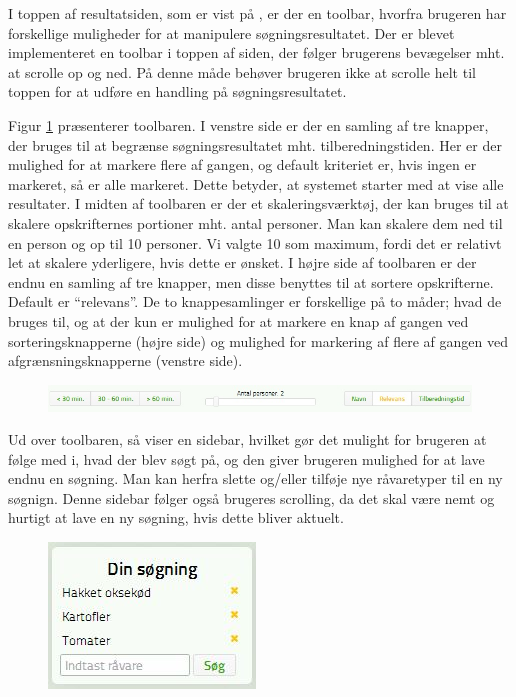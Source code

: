 I toppen af resultatsiden, som er vist på , er der en toolbar, hvorfra brugeren har forskellige muligheder for at manipulere søgningsresultatet. Der er blevet implementeret en toolbar i toppen af siden, der følger brugerens bevægelser mht. at scrolle op og ned. På denne måde behøver brugeren ikke at scrolle helt til toppen for at udføre en handling på søgningsresultatet. 

Figur \ref{fig:foodl-toolbar} præsenterer toolbaren. I venstre side er der en samling af tre knapper, der bruges til at begrænse søgningsresultatet mht. tilberedningstiden. Her er der mulighed for at markere flere af gangen, og default kriteriet er, hvis ingen er markeret, så er alle markeret. Dette betyder, at systemet starter med at vise alle resultater. 
I midten af toolbaren er der et skaleringsværktøj, der kan bruges til at skalere opskrifternes portioner mht. antal personer. Man kan skalere dem ned til en person og op til 10 personer. Vi valgte 10 som maximum, fordi det er relativt let at skalere yderligere, hvis dette er ønsket. 
I højre side af toolbaren er der endnu en samling af tre knapper, men disse benyttes til at sortere opskrifterne. Default er ``relevans''. De to knappesamlinger er forskellige på to måder; hvad de bruges til, og at der kun er mulighed for at markere en knap af gangen ved sorteringsknapperne (højre side) og mulighed for markering af flere af gangen ved afgrænsningsknapperne (venstre side).

\begin{figure}[H]
	\centering
	\includegraphics[scale=0.7]{billeder/foodl/toolbar.jpg}
	\label{fig:foodl-toolbar}
\end{figure}

Ud over toolbaren, så viser  en sidebar, hvilket gør det mulight for brugeren at følge med i, hvad der blev søgt på, og den giver brugeren mulighed for at lave endnu en søgning. Man kan herfra slette og/eller tilføje nye råvaretyper til en ny søgnign. Denne sidebar følger også brugeres scrolling, da det skal være nemt og hurtigt at lave en ny søgning, hvis dette bliver aktuelt.

\begin{figure}[H]
	\centering
	\includegraphics[scale=0.7]{billeder/foodl/sidebar.jpg}
	\label{fig:foodl-sidebar}
\end{figure}

